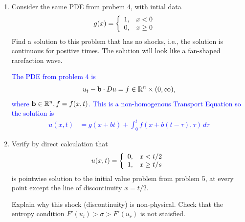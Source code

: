 \documentclass[10pt,a4paper]{report}
\newcommand{\BLUE}[1]{\textcolor{blue}{#1}}
\begin{document}
\begin{enumerate}
\BLUE{Rewrite the expression in terms of $u_x$
\begin{align*}
	u_t+\PAREN{\frac{1}{3}u^3}_x &= u_t+u^2u_x 
\end{align*}hence the characteristic speed is $f'(u) = u^2$ which depends on $u$, thus, generate a shock.  Defining
\begin{align*}
	f(u_L) &=  1/3 \text{ for } x<0 \AND f(u_R) = 0 \text{ for } x\ge 0 
\end{align*}these are then used in the Rankin-Hugoniot condition as 
\begin{align*}
	s= \frac{f(u_R)-f(u_L)}{u_R-u_L} &= \frac{0-1/3}{0-1} = \frac{1}{3}
\end{align*}Further, we must have that  $f'(u_L) > s > f'(u_R)$, thus $(f'(1) = 1) > (s=1/3) > (f'(0)=0)$, which is true.  Therefore, 
\begin{align*}
	u(x,t) &= \BINDEF{1, & x < \frac{1}{3}t}{0, & x > \frac{1}{3}t}
\end{align*}
}

\item Consider the same PDE from probem 4, with intial data
\begin{align*}
	g(x) &= \left \{ \begin{array}{ll} 1,&x<0\\ 0,&x\ge 0 \end{array} \right .
\end{align*}Find a solution to this problem that has no shocks, i.e., the solution is continuous for positive times.  The solution will look like a fan-shaped rarefaction wave.

\BLUE{The PDE from problem 4 is 
\begin{align*}
	u_t-\textbf{b}\cdot Du = f \in \mathbb{R}^n \times (0,\infty),
\end{align*}where $\textbf{b}\in \mathbb{R}^n, f=f(x,t)$. This is a non-homogenous Transport Equation so the solution is 
\begin{align*}
	u(x,t) &= g(x+bt) + \int_0^t f(x+b(t-\tau), \tau)\, d\tau
\end{align*}
}

\item Verify by direct calculation that 
\begin{align*}
	u(x,t) = \left \{ \begin{array}{ll} 0, &x< t/2\\ 1,&x\ge t/s \end{array} \right .
\end{align*}is pointwise solution to the initial value problem from problem 5, at every point except the line of discontinuity $x = t/2$.

Explain why this shock (discontinuity) is non-physical.  Check that the entropy condition $F'(u_l)>\sigma>F'(u_r)$ is not staisfied.


\end{enumerate}
\end{document}
